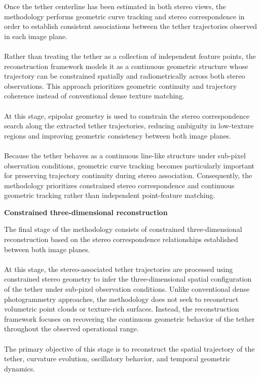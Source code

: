 Once the tether centerline has been estimated in both stereo views, the methodology performs geometric curve tracking and stereo correspondence in order to establish consistent associations between the tether trajectories observed in each image plane.
\\\\
Rather than treating the tether as a collection of independent feature points, the reconstruction framework models it as a continuous geometric structure whose trajectory can be constrained spatially and radiometrically across both stereo observations. This approach prioritizes geometric continuity and trajectory coherence instead of conventional dense texture matching.
\\\\
At this stage, epipolar geometry is used to constrain the stereo correspondence search along the extracted tether trajectories, reducing ambiguity in low-texture regions and improving geometric consistency between both image planes.
\\\\
Because the tether behaves as a continuous line-like structure under sub-pixel observation conditions, geometric curve tracking becomes particularly important for preserving trajectory continuity during stereo association. Consequently, the methodology prioritizes constrained stereo correspondence and continuous geometric tracking rather than independent point-feature matching.

\vspace{0.5cm}
\noindent \textbf{Constrained three-dimensional reconstruction}
\vspace{0.2cm}

The final stage of the methodology consists of constrained three-dimensional reconstruction based on the stereo correspondence relationships established between both image planes.
\\\\
At this stage, the stereo-associated tether trajectories are processed using constrained stereo geometry to infer the three-dimensional spatial configuration of the tether under sub-pixel observation conditions. Unlike conventional dense photogrammetry approaches, the methodology does not seek to reconstruct volumetric point clouds or texture-rich surfaces. Instead, the reconstruction framework focuses on recovering the continuous geometric behavior of the tether throughout the observed operational range.
\\\\
The primary objective of this stage is to reconstruct the spatial trajectory of the tether, curvature evolution, oscillatory behavior, and temporal geometric dynamics.

